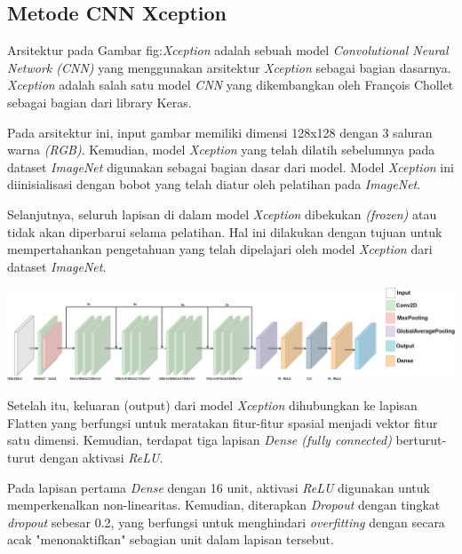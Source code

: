 \subsection{Metode CNN Xception}

Arsitektur pada Gambar {fig:\textit{Xception}} adalah sebuah model \textit{Convolutional Neural Network (\textit{CNN})} yang menggunakan arsitektur \textit{Xception} sebagai bagian dasarnya. \textit{Xception} adalah salah satu model \textit{CNN} yang dikembangkan oleh François Chollet sebagai bagian dari library Keras.

Pada arsitektur ini, input gambar memiliki dimensi 128x128 dengan 3 saluran warna \textit{(RGB)}. Kemudian, model \textit{Xception} yang telah dilatih sebelumnya pada dataset \textit{ImageNet} digunakan sebagai bagian dasar dari model. Model \textit{Xception} ini diinisialisasi dengan bobot yang telah diatur oleh pelatihan pada \textit{ImageNet}.

Selanjutnya, seluruh lapisan di dalam model \textit{Xception} dibekukan \textit{(frozen)} atau tidak akan diperbarui selama pelatihan. Hal ini dilakukan dengan tujuan untuk mempertahankan pengetahuan yang telah dipelajari oleh model \textit{Xception} dari dataset \textit{ImageNet}.

\begin{center}
	\includegraphics[width=1.0\linewidth]{gambar/bener//Arsitektur_CNNXception_Modifikasi.png}
	\label{fig:Xception}
\end{center}


Setelah itu, keluaran (output) dari model \textit{Xception} dihubungkan ke lapisan Flatten yang berfungsi untuk meratakan fitur-fitur spasial menjadi vektor fitur satu dimensi. Kemudian, terdapat tiga lapisan \textit{Dense (fully connected)} berturut-turut dengan aktivasi \textit{ReLU}.

Pada lapisan pertama \textit{Dense} dengan 16 unit, aktivasi \textit{ReLU} digunakan untuk memperkenalkan non-linearitas. Kemudian, diterapkan \textit{Dropout} dengan tingkat \textit{dropout} sebesar 0.2, yang berfungsi untuk menghindari \textit{overfitting} dengan secara acak "menonaktifkan" sebagian unit dalam lapisan tersebut.

